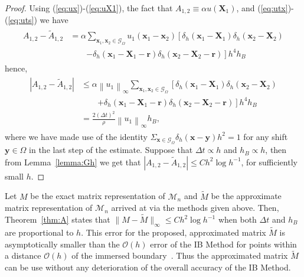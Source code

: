 \documentclass[preprint,12pt]{elsarticle}
\newcommand{\norm}[1]{\left\lVert#1\right\rVert}
\begin{document}
\begin{proof}
Using (\ref{eq:ux})-(\ref{eq:uX1}), the fact that $A_{1,2} \equiv \alpha u(\mathbf{X}_1)$, and (\ref{eq:utx})-(\ref{eq:uts}) we have
\begin{align}
\begin{split}
A_{1,2}-\tilde{A}_{1,2} &= 
\alpha\sum_{\mathbf{x}_1,\mathbf{x}_2\in\mathcal{G}_\Omega}
u_1(\mathbf{x}_1 - \mathbf{x}_2)
\left[
\delta_h(\mathbf{x}_1 - \mathbf{X}_1)
\delta_h(\mathbf{x}_2 - \mathbf{X}_2) \right. \\ &\qquad\left.
-
\delta_h(\mathbf{x}_1 - \mathbf{X}_1 - \mathbf{r})
\delta_h(\mathbf{x}_2 - \mathbf{X}_2 - \mathbf{r})
\right]h^4h_B
\end{split}
\end{align}
hence,
\begin{align}
\begin{split}
|A_{1,2}-\tilde{A}_{1,2}|
&\leq 
\alpha\norm{u_1}_\infty
\sum_{\mathbf{x}_1,\mathbf{x}_2\in\mathcal{G}_\Omega}
\left[
\delta_h(\mathbf{x}_1 - \mathbf{X}_1)
\delta_h(\mathbf{x}_2 - \mathbf{X}_2) \right. \\ &\qquad\left.
+
\delta_h(\mathbf{x}_1 - \mathbf{X}_1 - \mathbf{r})
\delta_h(\mathbf{x}_2 - \mathbf{X}_2 - \mathbf{r})
\right]h^4h_B \\
&=
\frac{2(\Delta t)^2}{\rho} \norm{u_1}_\infty h_B,
\end{split}
\end{align}
where we have made use of the identity $\Sigma_{\mathbf{x}\in\mathcal{G}_\Omega}\delta_h(\mathbf{x}-\mathbf{y})h^2=1$ for any shift $\mathbf{y}\in\Omega$ in the last step of the estimate.
Suppose that $\Delta t \propto h$ and $h_B \propto h$, then  from Lemma~\ref{lemma:Gh} we get that 
$|A_{1,2}-\tilde{A}_{1,2}| \leq C h^2 \log h^{-1}$, for sufficiently small
$h$.
\end{proof}
Let $M$ be the exact matrix representation of $\mathcal{M}_n$ and $\tilde{M}$ be the approximate matrix representation of $\mathcal{M}_n$ arrived at via the methods given above. Then, Theorem~\ref{thm:A} states that $\|M-\tilde{M}\|_{\infty} \leq C h^2 \log h^{-1}$ when both $\Delta t$ and $h_B$ are  proportional to $h$.  This error for the proposed, approximated matrix $\tilde{M}$
is asymptotically smaller than the $\mathcal{O}(h)$ error of the IB Method for points within a distance $\mathcal{O}(h)$ of the immersed boundary~\cite{Mori2008}. Thus the approximated matrix $\tilde{M}$ can be use without any deterioration of the overall accuracy of the IB Method.
\end{document}
